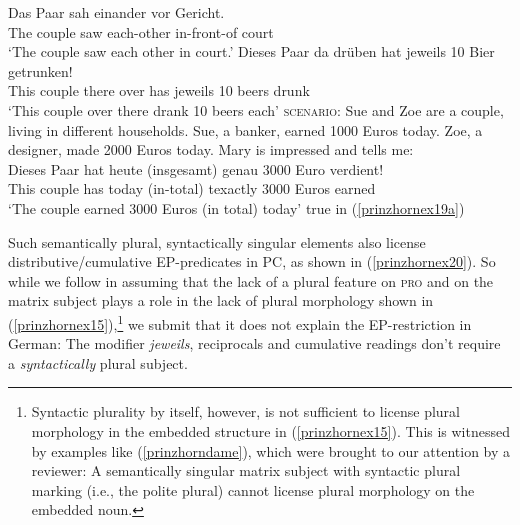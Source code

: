 \documentclass[output=paper,colorlinks,citecolor=brown,
]{langscibook}
\begin{document}
\ea \label{prinzhornex18} 
\ea 
\gll Das Paar sah einander vor Gericht.\\
  The couple saw each-other in-front-of  court \\
\glt `The couple saw each other in court.' \label{prinzhornex18a}
\ex   \gll Dieses Paar da drüben hat jeweils 10 Bier getrunken! \\
  This couple there over has jeweils 10 beers drunk\\
\glt `This couple over there drank 10 beers each'  \label{prinzhornex18b}
\ex  \textsc{scenario:} Sue and Zoe are a couple, living in different households. Sue, a banker, earned 1000 Euros today. Zoe, a designer, made 2000 Euros today. Mary is impressed and tells me: \label{prinzhornex19a}\\
\gll Dieses Paar hat heute (insgesamt) genau 3000 Euro verdient!\\
This couple has today (in-total) texactly 3000 Euros earned \\
\glt `The couple earned 3000 Euros (in total) today' \label{prinzhornex19b}\phantom{.}\hfill {true} in (\ref{prinzhornex19a})
\z\z

Such semantically plural, syntactically singular elements also license distributive\slash cumulative EP-predicates in PC, as shown in (\ref{prinzhornex20}). So while we follow \citet{Landau:2000} in assuming that the lack of a plural feature on \textsc{pro} and on the matrix subject plays a role in the lack of plural morphology shown in (\ref{prinzhornex15}),\footnote{Syntactic plurality by itself, however, is not sufficient to license plural morphology in the embedded structure in (\ref{prinzhornex15}). This is witnessed by examples like (\ref{prinzhorndame}), which were brought to our attention by a reviewer: A  semantically singular matrix subject with syntactic plural marking (i.e., the polite plural) cannot license plural morphology on the embedded noun.


\z

} we submit that it does not explain the EP-restriction in German: The modifier {\it jeweils}, reciprocals and cumulative readings don't require a \textit{syntactically} plural subject.
\end{document}
